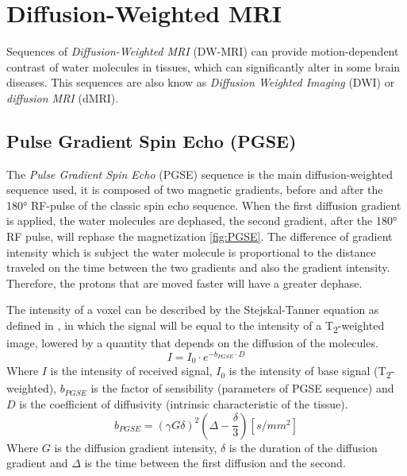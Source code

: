 \section{Diffusion-Weighted MRI}
 Sequences of \emph{Diffusion-Weighted MRI} (DW-MRI) can provide motion-dependent contrast of water molecules in tissues, which can significantly alter in some brain diseases. This sequences are also know as \emph{Diffusion Weighted Imaging} (DWI) or \emph{diffusion MRI} (dMRI). 
 \subsection{Pulse Gradient Spin Echo (PGSE)}
 The \emph{Pulse Gradient Spin Echo} (PGSE) sequence is the main diffusion-weighted sequence used, it is composed of two magnetic gradients, before and after the 180° RF-pulse of the classic spin echo sequence. When the first diffusion gradient is applied, the water molecules are dephased, the second gradient, after the 180° RF pulse, will rephase the magnetization \ref{fig:PGSE}. The difference of gradient intensity which is subject the water molecule is proportional to the distance traveled on the time between the two gradients and also the gradient intensity. Therefore, the protons that are moved faster will have a greater dephase.\cite{elementiRisonanza}

 The intensity of a voxel can be described by the Stejskal-Tanner equation as defined in \cite{dtiBook}, in which the signal will be equal to the intensity of a T\textsubscript{2}-weighted image, lowered by a quantity that depends on the diffusion of the molecules.
 \begin{equation}
    I = I_0 \cdot e^{-b_{PGSE} \cdot D}
 \end{equation}
 Where $I$ is the intensity of received signal, $I_0$ is the intensity of base signal (T\textsubscript{2}-weighted), $b_{PGSE}$ is the factor of sensibility (parameters of PGSE sequence) and $D$ is the coefficient of diffusivity (intrinsic characteristic of the tissue).
 \begin{equation}
    b_{PGSE} = (\gamma G \delta)^{2}(\Delta - \frac{\delta}{3}) [s/mm^2]
 \end{equation}
 Where $G$ is the diffusion gradient intensity, $\delta$ is the duration of the diffusion gradient and $\Delta$ is the time between the first diffusion and the second.

